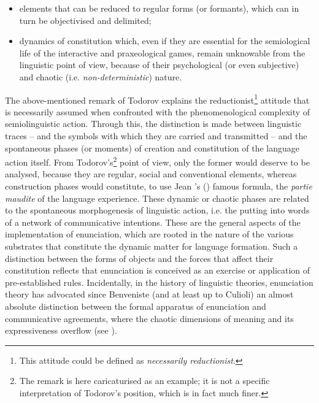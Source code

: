\documentclass[output=paper]{langscibook}
\begin{document}
\begin{itemize}
\item elements that can be reduced to regular forms (or formants), which can in turn be objectivised and delimited;

\item dynamics of constitution which, even if they are essential for the semiological life of the interactive and praxeological games, remain unknowable from the linguistic point of view, because of their psychological (or even subjective) and chaotic (i.e. \textit{non-deterministic}) nature.

\end{itemize}

\begin{sloppypar}
The above-mentioned remark of Todorov explains the reductionist\footnote{This attitude could be defined as \textit{necessarily reductionist}.} attitude that is necessarily assumed when confronted with the phenomenological complexity of semiolinguistic action. Through this, the distinction is made between linguistic traces -- and the symbols with which they are carried and transmitted -- and the spontaneous phases (or moments) of creation and constitution of the language action itself. From Todorov’s\footnote{The remark is here caricaturised as an example; it is not a specific interpretation of Todorov's position, which is in fact much finer.}  point of view, only the former would deserve to be analysed, because they are regular, social and conventional elements, whereas construction phases would constitute, to use Jean \citeauthor{Petitot-Cocorda1985}'s (\citeyear{Petitot-Cocorda1985,Petitot-Cocorda1992}) famous formula, the \textit{partie maudite} of the language experience. These dynamic or chaotic phases are related to the spontaneous morphogenesis of linguistic action, i.e. the putting into words of a network of communicative intentions. These are the general aspects of the implementation of enunciation, which are rooted in the nature of the various substrates that constitute the dynamic matter for language formation. Such a distinction between the forms of objects and the forces that affect their constitution reflects that enunciation is conceived as an exercise or application of pre-established \citep{Ingold2013} rules. Incidentally, in the history of linguistic theories, enunciation theory has advocated since Benveniste (and at least up to Culioli) an almost absolute distinction between the formal apparatus of enunciation and communicative agreements, where the chaotic dimensions of meaning and its expressiveness overflow (see \citealt{Bondi2016,Ducard2012,Longhi2012}).


\end{sloppypar}
\end{document}
